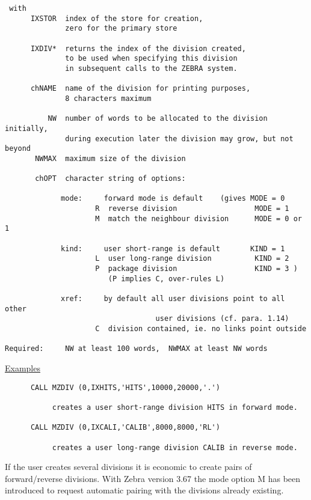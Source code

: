 \begin{verbatim}
 with
      IXSTOR  index of the store for creation,
              zero for the primary store

      IXDIV*  returns the index of the division created,
              to be used when specifying this division
              in subsequent calls to the ZEBRA system.

      chNAME  name of the division for printing purposes,
              8 characters maximum

          NW  number of words to be allocated to the division initially,
              during execution later the division may grow, but not beyond
       NWMAX  maximum size of the division

       chOPT  character string of options:

             mode:     forward mode is default    (gives MODE = 0
                     R  reverse division                  MODE = 1
                     M  match the neighbour division      MODE = 0 or 1

             kind:     user short-range is default       KIND = 1
                     L  user long-range division          KIND = 2
                     P  package division                  KIND = 3 )
                        (P implies C, over-rules L)

             xref:     by default all user divisions point to all other
                                   user divisions (cf. para. 1.14)
                     C  division contained, ie. no links point outside

Required:     NW at least 100 words,  NWMAX at least NW words

\end{verbatim}

\ul{Examples}
\begin{verbatim}
      CALL MZDIV (0,IXHITS,'HITS',10000,20000,'.')

           creates a user short-range division HITS in forward mode.

      CALL MZDIV (0,IXCALI,'CALIB',8000,8000,'RL')

           creates a user long-range division CALIB in reverse mode.
\end{verbatim} 

If the user creates several divisions it is economic to create
pairs of forward/reverse divisions.
With Zebra version 3.67 the mode option M has been introduced
to request automatic pairing with the divisions already existing.

